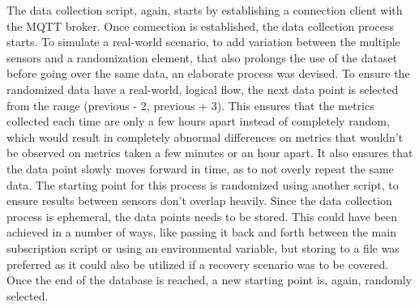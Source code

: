 The data collection script, again, starts by establishing a connection client with the MQTT broker. Once connection is established, the data collection process starts. To simulate a real-world scenario, to add variation between the multiple sensors and a randomization element, that also prolongs the use of the dataset before going over the same data, an elaborate process was devised. To ensure the randomized data have a real-world, logical flow, the next data point is selected from the range (previous - 2, previous + 3). This ensures that the metrics collected each time are only a few hours apart instead of completely random, which would result in completely abnormal differences on metrics that wouldn't be observed on metrics taken a few minutes or an hour apart. It also ensures that the data point slowly moves forward in time, as to not overly repeat the same data. The starting point for this process is randomized using another script, to ensure results between sensors don't overlap heavily. Since the data collection process is ephemeral, the data points needs to be stored. This could have been achieved in a number of ways, like passing it back and forth between the main subscription script or using an environmental variable, but storing to a file was preferred as it could also be utilized if a recovery scenario was to be covered. Once the end of the database is reached, a new starting point is, again, randomly selected.

